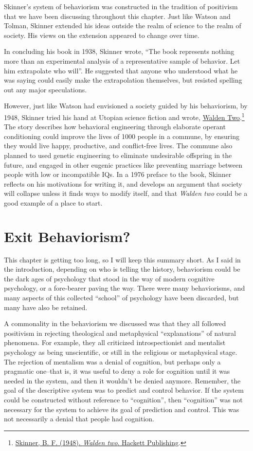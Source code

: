 \documentclass[
  oneside,
  12pt]{crumpbook}
\begin{document}
Skinner's system of behaviorism was constructed in the tradition of positivism that we have been discussing throughout this chapter. Just like Watson and Tolman, Skinner extended his ideas outside the realm of science to the realm of society. His views on the extension appeared to change over time.

In concluding his book in 1938, Skinner wrote, ``The book represents nothing more than an experimental analysis of a representative sample of behavior. Let him extrapolate who will''. He suggested that anyone who understood what he was saying could easily make the extrapolation themselves, but resisted spelling out any major speculations.

However, just like Watson had envisioned a society guided by his behaviorism, by 1948, Skinner tried his hand at Utopian science fiction and wrote, \href{https://en.wikipedia.org/wiki/Walden_Two}{Walden Two}.\footnote{\protect\hyperlink{ref-skinnerWaldenTwo1948}{Skinner, B. F. (1948). \emph{Walden two}. {Hackett Publishing}}.} The story describes how behavioral engineering through elaborate operant conditioning could improve the lives of 1000 people in a commune, by ensuring they would live happy, productive, and conflict-free lives. The commune also planned to used genetic engineering to eliminate undesirable offspring in the future, and engaged in other eugenic practices like preventing marriage between people with low or incompatible IQs. In a 1976 preface to the book, Skinner reflects on his motivations for writing it, and develops an argument that society will collapse unless it finds ways to modify itself, and that \emph{Walden two} could be a good example of a place to start.

\hypertarget{exit-behaviorism}{%
\section{Exit Behaviorism?}\label{exit-behaviorism}}

This chapter is getting too long, so I will keep this summary short. As I said in the introduction, depending on who is telling the history, behaviorism could be the dark ages of psychology that stood in the way of modern cognitive psychology, or a fore-bearer paving the way. There were many behaviorisms, and many aspects of this collected ``school'' of psychology have been discarded, but many have also be retained.

A commonality in the behaviorism we discussed was that they all followed positivism in rejecting theological and metaphysical ``explanations'' of natural phenomena. For example, they all criticized introspectionist and mentalist psychology as being unscientific, or still in the religious or metaphysical stage. The rejection of mentalism was a denial of cognition, but perhaps only a pragmatic one--that is, it was useful to deny a role for cognition until it was needed in the system, and then it wouldn't be denied anymore. Remember, the goal of the descriptive system was to predict and control behavior. If the system could be constructed without reference to ``cognition'', then ``cognition'' was not necessary for the system to achieve its goal of prediction and control. This was not necessarily a denial that people had cognition.
\end{document}
